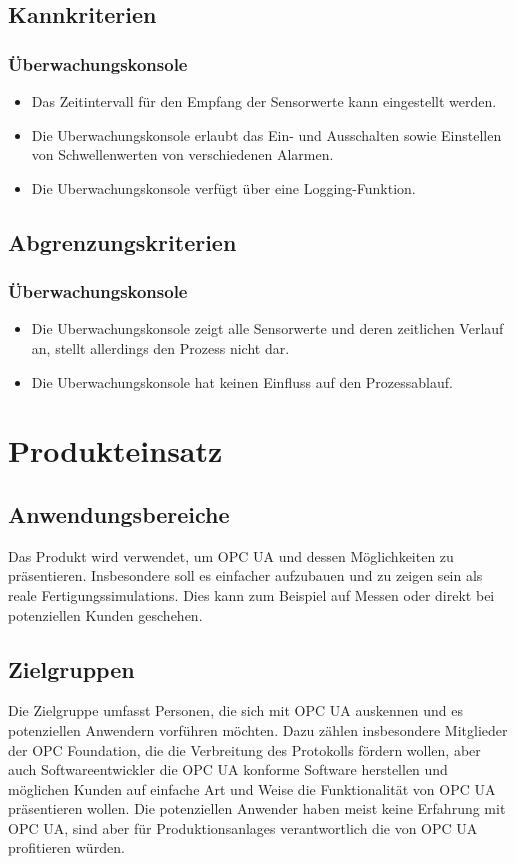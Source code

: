 \documentclass[parskip=full]{scrartcl}
\begin{document}
\subsection{Kannkriterien}
\subsubsection{Überwachungskonsole}
\begin{itemize}
\item Das Zeitintervall für den Empfang der Sensorwerte kann eingestellt werden.
\item Die \gls{Uberwachungskonsole} erlaubt das Ein- und Ausschalten sowie Einstellen von Schwellenwerten von verschiedenen Alarmen.
\item Die \gls{Uberwachungskonsole} verfügt über eine Logging-Funktion.
\end{itemize}
\subsection{Abgrenzungskriterien}
\subsubsection{Überwachungskonsole}
\begin{itemize}
\item Die \gls{Uberwachungskonsole} zeigt alle Sensorwerte und deren zeitlichen Verlauf an, stellt allerdings den Prozess nicht dar.
\item Die \gls{Uberwachungskonsole} hat keinen Einfluss auf den Prozessablauf.
\end{itemize}

\newpage
\section{Produkteinsatz}
\subsection{Anwendungsbereiche}
Das Produkt wird verwendet, um \gls{OPC UA} und dessen Möglichkeiten zu präsentieren.
Insbesondere soll es einfacher aufzubauen und zu zeigen sein als reale \glspl{Fertigungssimulation}.
Dies kann zum Beispiel auf Messen oder direkt bei potenziellen Kunden geschehen.
\subsection{Zielgruppen}
Die Zielgruppe umfasst Personen, die sich mit OPC UA auskennen und es potenziellen Anwendern vorführen möchten.
Dazu zählen insbesondere Mitglieder der OPC Foundation, die die Verbreitung des Protokolls fördern wollen,
aber auch Softwareentwickler die OPC UA konforme Software herstellen und möglichen Kunden auf einfache Art und
Weise die Funktionalität von OPC UA präsentieren wollen.
Die potenziellen Anwender haben meist keine Erfahrung mit OPC UA, sind aber für \glspl{Produktionsanlage} verantwortlich
die von OPC UA profitieren würden.
\end{document}
